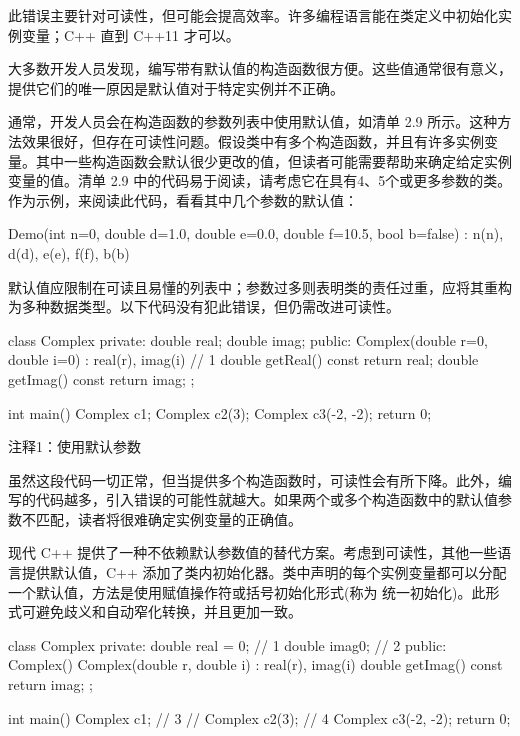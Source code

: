 此错误主要针对可读性，但可能会提高效率。许多编程语言能在类定义中初始化实例变量；C++ 直到 C++11 才可以。


大多数开发人员发现，编写带有默认值的构造函数很方便。这些值通常很有意义，提供它们的唯一原因是默认值对于特定实例并不正确。

通常，开发人员会在构造函数的参数列表中使用默认值，如清单 2.9 所示。这种方法效果很好，但存在可读性问题。假设类中有多个构造函数，并且有许多实例变量。其中一些构造函数会默认很少更改的值，但读者可能需要帮助来确定给定实例变量的值。清单 2.9 中的代码易于阅读，请考虑它在具有4、5个或更多参数的类。作为示例，来阅读此代码，看看其中几个参数的默认值：

\begin{cpp}
Demo(int n=0, double d=1.0, double e=0.0, double f=10.5, bool b=false) :
n(n), d(d), e(e), f(f), b(b) {}
\end{cpp}

默认值应限制在可读且易懂的列表中；参数过多则表明类的责任过重，应将其重构为多种数据类型。以下代码没有犯此错误，但仍需改进可读性。


\begin{cpp}
class Complex {
private:
  double real;
  double imag;
public:
  Complex(double r=0, double i=0) : real(r), imag(i) {} // 1
  double getReal() const { return real; }
  double getImag() const { return imag; }
};

int main() {
  Complex c1;
  Complex c2(3);
  Complex c3(-2, -2);
  return 0;
}
\end{cpp}

{\footnotesize
注释1：使用默认参数
}


虽然这段代码一切正常，但当提供多个构造函数时，可读性会有所下降。此外，编写的代码越多，引入错误的可能性就越大。如果两个或多个构造函数中的默认值参数不匹配，读者将很难确定实例变量的正确值。


现代 C++ 提供了一种不依赖默认参数值的替代方案。考虑到可读性，其他一些语言提供默认值，C++ 添加了类内初始化器。类中声明的每个实例变量都可以分配一个默认值，方法是使用赋值操作符或括号初始化形式(称为 统一初始化)。此形式可避免歧义和自动窄化转换，并且更加一致。


\begin{cpp}
class Complex {
private:
  double real = 0; // 1
  double imag{0}; // 2
public:
  Complex() {}
  Complex(double r, double i) : real(r), imag(i) {}
  double getImag() const { return imag; }
};

int main() {
  Complex c1; // 3
  // Complex c2(3); // 4
  Complex c3(-2, -2);
  return 0;
}
\end{cpp}

